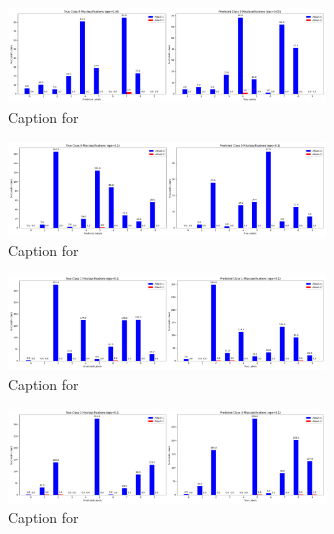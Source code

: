 \documentclass{article}
\begin{document}
\begin{figure}[!htbp]
\centering
\includegraphics[width=0.75\textwidth]{combined_class_boundary_pgd/combined_class_9_misclassifications_eps_0.05.png}
\caption{Caption for }
\label{fig:combined_class_9_misclassifications_eps_0.05.png}
\end{figure}

\begin{figure}[!htbp]
\centering
\includegraphics[width=0.75\textwidth]{combined_class_boundary_pgd/combined_class_0_misclassifications_eps_0.1.png}
\caption{Caption for }
\label{fig:combined_class_0_misclassifications_eps_0.1.png}
\end{figure}

\begin{figure}[!htbp]
\centering
\includegraphics[width=0.75\textwidth]{combined_class_boundary_pgd/combined_class_1_misclassifications_eps_0.1.png}
\caption{Caption for }
\label{fig:combined_class_1_misclassifications_eps_0.1.png}
\end{figure}

\begin{figure}[!htbp]
\centering
\includegraphics[width=0.75\textwidth]{combined_class_boundary_pgd/combined_class_3_misclassifications_eps_0.1.png}
\caption{Caption for }
\label{fig:combined_class_3_misclassifications_eps_0.1.png}
\end{figure}
\end{document}
